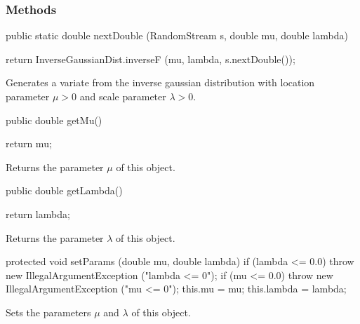 \subsubsection* {Methods}
\begin{code}

   public static double nextDouble (RandomStream s,
                                    double mu, double lambda)\begin{hide} {
      return InverseGaussianDist.inverseF (mu, lambda, s.nextDouble());
   }\end{hide}
\end{code}
\begin{tabb} Generates a variate from the inverse gaussian distribution
   with location parameter $\mu > 0$ and scale parameter $\lambda > 0$.
\end{tabb}
\begin{code}

   public double getMu()\begin{hide} {
      return mu;
   }\end{hide}
\end{code}
 \begin{tabb} Returns the parameter $\mu$ of this object.
 \end{tabb}
\begin{code}

   public double getLambda()\begin{hide} {
      return lambda;
   }\end{hide}
\end{code}
 \begin{tabb} Returns the parameter $\lambda$ of this object.
 \end{tabb}
\begin{hide}\begin{code}

   protected void setParams (double mu, double lambda) {
      if (lambda <= 0.0)
         throw new IllegalArgumentException ("lambda <= 0");
      if (mu <= 0.0)
         throw new IllegalArgumentException ("mu <= 0");
      this.mu = mu;
      this.lambda = lambda;
   }
\end{code}
\begin{tabb}
   Sets the parameters $\mu$ and $\lambda$ of this object.
\end{tabb}
\begin{code}
}
\end{code}
\end{hide}
